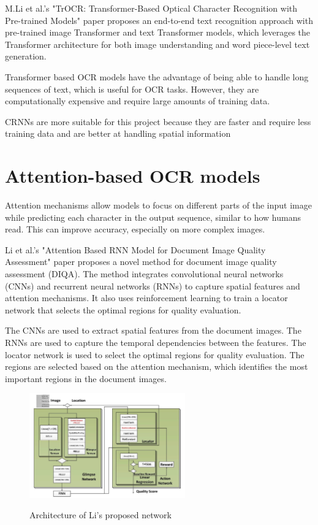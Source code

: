 M.Li et al.'s "TrOCR: Transformer-Based Optical Character Recognition with Pre-trained Models" paper proposes an end-to-end text recognition approach with pre-trained image Transformer and text Transformer models, which leverages the Transformer architecture for both image understanding and word piece-level text generation. \cite{liTrOCRTransformerBasedOptical2023}

Transformer based OCR models have the advantage of being able to handle long sequences of text, which is useful for OCR tasks. However, they are computationally expensive and require large amounts of training data.

CRNNs are more suitable for this project because they are faster and require less training data and are better at handling spatial information

\newpage

\section{Attention-based OCR models}

Attention mechanisms allow models to focus on different parts of the input image while predicting each character in the output sequence, similar to how humans read. This can improve accuracy, especially on more complex images.

Li et al.'s "Attention Based RNN Model for Document Image Quality Assessment" paper proposes a novel method for document image quality assessment (DIQA). The method integrates convolutional neural networks (CNNs) and recurrent neural networks (RNNs) to capture spatial features and attention mechanisms. It also uses reinforcement learning to train a locator network that selects the optimal regions for quality evaluation.

The CNNs are used to extract spatial features from the document images. The RNNs are used to capture the temporal dependencies between the features. The locator network is used to select the optimal regions for quality evaluation. The regions are selected based on the attention mechanism, which identifies the most important regions in the document images. \cite{liAttentionBasedRNN2017}


\begin{figure}[ht]
    \centering
    \includegraphics[width=0.6\textwidth]{Figures/AT_Li.jpg}
    \caption[Architecture of Li's proposed network]{Architecture of Li's proposed network}\cite{liAttentionBasedRNN2017}
    \label{fig:Li's Proposed Architecture}
\end{figure}

